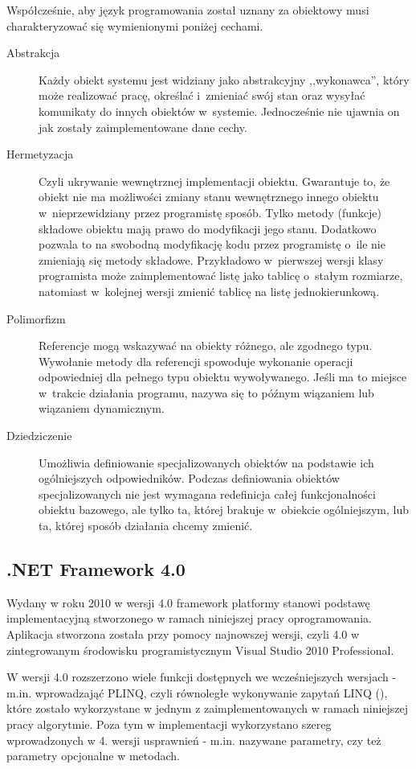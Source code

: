 Współcześnie, aby język programowania został uznany za obiektowy musi charakteryzować się wymienionymi poniżej cechami.
\begin{description}
	\item[Abstrakcja] Każdy obiekt systemu jest widziany jako abstrakcyjny ,,wykonawca'', który może realizować pracę, określać i~zmieniać swój stan oraz wysyłać komunikaty do innych obiektów w~systemie. Jednocześnie nie ujawnia on jak zostały zaimplementowane dane cechy.
	\item[Hermetyzacja] Czyli ukrywanie wewnętrznej implementacji obiektu. Gwarantuje to, że obiekt nie ma możliwości zmiany stanu wewnętrznego innego obiektu w~nieprzewidziany przez programistę sposób. Tylko metody (funkcje) składowe obiektu mają prawo do modyfikacji jego stanu. Dodatkowo pozwala to na swobodną modyfikację kodu przez programistę o~ile nie zmieniają się metody składowe. Przykładowo w~pierwszej wersji klasy programista może zaimplementować listę jako tablicę o~stałym rozmiarze, natomiast w~kolejnej wersji zmienić tablicę na listę jednokierunkową.
	\item[Polimorfizm] Referencje mogą wskazywać na obiekty różnego, ale zgodnego typu. Wywołanie metody dla referencji spowoduje wykonanie operacji odpowiedniej dla pełnego typu obiektu wywoływanego. Jeśli ma to miejsce w~trakcie działania programu, nazywa się to późnym wiązaniem lub wiązaniem dynamicznym.
	\item[Dziedziczenie] Umożliwia definiowanie specjalizowanych obiektów na podstawie ich ogólniejszych odpowiedników. Podczas definiowania obiektów specjalizowanych nie jest wymagana redefinicja całej funkcjonalności obiektu bazowego, ale tylko ta, której brakuje w~obiekcie ogólniejszym, lub ta, której sposób działania chcemy zmienić.
	
\end{description}

\subsection{.NET Framework 4.0}
Wydany w roku 2010 w wersji 4.0 framework platformy stanowi podstawę implementacyjną stworzonego w ramach niniejszej pracy oprogramowania. Aplikacja stworzona została przy pomocy najnowszej wersji, czyli 4.0 w zintegrowanym środowisku programistycznym Visual Studio 2010 Professional. 

W wersji 4.0 rozszerzono wiele funkcji dostępnych we wcześniejszych wersjach - m.in. wprowadzająć PLINQ, czyli równoległe wykonywanie zapytań LINQ (), które zostało wykorzystane w jednym z zaimplementowanych w ramach niniejszej pracy algorytmie. Poza tym w implementacji wykorzystano szereg wprowadzonych w 4. wersji usprawnień - m.in. nazywane parametry, czy też parametry opcjonalne w metodach. 

